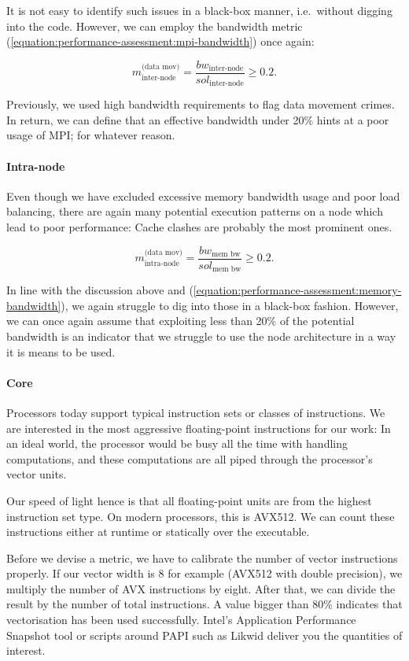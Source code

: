 It is not easy to identify such issues in a black-box manner, i.e.~without
digging into the code.
However, we can employ the bandwidth metric
(\ref{equation:performance-assessment:mpi-bandwidth}) once again:

\[
m^{\text{(data mov)}}_{\text{inter-node}} = \frac{bw_{\text{inter-node}} }{
sol_{\text{inter-node}} } \geq 0.2.
\]


\noindent
Previously, we used high bandwidth requirements to flag data movement crimes.
In return, we can define that an effective bandwidth under 20\% hints at a poor
usage of MPI; for whatever reason.


\paragraph*{Intra-node}

Even though we have excluded excessive memory bandwidth usage and poor load
balancing, there are again many potential execution patterns on a node which
lead to poor performance:
Cache clashes are probably the most prominent ones.


\[
m^{\text{(data mov)}}_{\text{intra-node}} = \frac{bw_{\text{mem bw}} }{
sol_{\text{mem bw}} } \geq 0.2.
\]


\noindent
In line with the discussion above and
(\ref{equation:performance-assessment:memory-bandwidth}), we again struggle to dig into those in a black-box fashion.
However, we can once again assume that exploiting less than 20\% of the
potential bandwidth is an indicator that we struggle to use the node
architecture in a way it is means to be used.


\paragraph*{Core}

Processors today support typical instruction sets or classes of instructions.
We are interested in the most aggressive floating-point instructions for our
work: 
In an ideal world, the processor would be busy all the time with handling
computations, and these computations are all piped through the processor's
vector units.

Our speed of light hence is that all floating-point units are from the highest
instruction set type.
On modern processors, this is AVX512.
We can count these instructions either at runtime or statically over the
executable.


Before we devise a metric, we have to calibrate the number of vector
instructions properly.
If our vector width is 8 for example (AVX512 with double precision), we multiply
the number of AVX instructions by eight.
After that, we can divide the result by the number of total instructions.
A value bigger than 80\% indicates that vectorisation has been used
successfully.
Intel's Application Performance Snapshot tool or scripts around PAPI such as
Likwid deliver you the quantities of interest.


